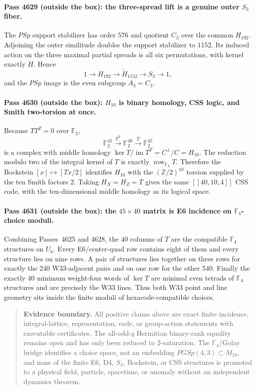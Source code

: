 \paragraph{Pass 4629 (outside the box): the three-spread lift is a genuine outer $S_3$ fiber.}
The $PSp$ support stabilizer has order $576$ and quotient $C_3$ over the common
$H_{192}$.  Adjoining the outer similitude doubles the support stabilizer to
$1152$.  Its induced action on the three maximal partial spreads is all six
permutations, with kernel exactly $H$.  Hence
\[
 \boxed{1\longrightarrow H_{192}\longrightarrow\widetilde H_{1152}
 \longrightarrow S_3\longrightarrow1},
\]
and the $PSp$ image is the even subgroup $A_3=C_3$.

\paragraph{Pass 4630 (outside the box): $H_{10}$ is binary homology, CSS logic, and Smith two-torsion at once.}
Because $TT^T=0$ over $\mathbb F_2$,
\[
 \mathbb F_2^{45}\xrightarrow{T^T}\mathbb F_2^{40}
 \xrightarrow{T}\mathbb F_2^{45}
\]
is a complex with middle homology
$\ker T/\operatorname{im}T^T=C^\perp/C=H_{10}$.  The reduction modulo two of
the integral kernel of $T$ is exactly $\operatorname{row}_{\mathbb F_2}T$.
Therefore the Bockstein $[x]\mapsto[Tx/2]$ identifies $H_{10}$ with the
$(\mathbb Z/2)^{10}$ torsion supplied by the ten Smith factors $2$.  Taking
$H_X=H_Z=T$ gives the same $[[40,10,4]]$ CSS code, with the ten-dimensional
middle homology as its logical space.

\paragraph{Pass 4631 (outside the box): the $45\times40$ matrix is E6 incidence on $\mathbb F_4$-choice moduli.}
Combining Passes~4625 and 4628, the $40$ columns of $T$ are the compatible
$\mathbb F_4$ structures on $U_6$.  Every E6/center-quad row contains eight of
them and every structure lies on nine rows.  A pair of structures lies together
on three rows for exactly the $240$ W33-adjacent pairs and on one row for the
other $540$.  Finally the exactly $40$ minimum weight-four words of $\ker T$ are
minimal even tetrads of $\mathbb F_4$ structures and are precisely the W33
lines.  Thus both W33 point and line geometry sits inside the finite moduli of
hexacode-compatible choices.

\begin{quote}\small
\textbf{Evidence boundary.}
All positive claims above are exact finite incidence, integral-lattice,
representation, code, or group-action statements with executable certificates.
The all-odd-$q$ Hermitian binary-rank equality remains open and has only been
reduced to $2$-saturation.  The $\mathbb F_4$/Golay bridge identifies a choice
space, not an embedding $PGSp(4,3)\subset M_{24}$, and none of the finite E6,
D4, $S_3$, Bockstein, or CSS structures is promoted to a physical field,
particle, spacetime, or anomaly without an independent dynamics theorem.
\end{quote}
